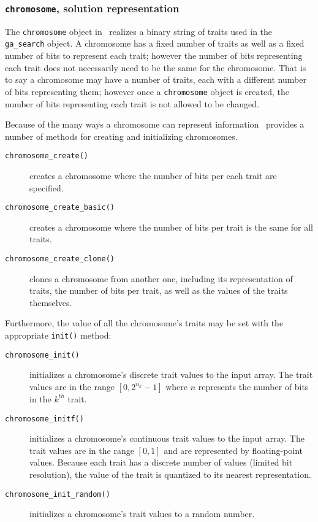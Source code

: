 \subsubsection{{\tt chromosome}, solution representation}
\label{module:optim:ga_search:chromosome}
The {\tt chromosome} object in \liquid\ realizes a binary string of
traits used in the {\tt ga\_search} object.
A chromosome has a fixed number of traits as well as a fixed number of
bits to represent each trait;
however the number of bits representing each trait does not necessarily
need to be the same for the chromosome.
That is to say a chromosome may have a number of traits, each with a
different number of bits representing them;
however once a {\tt chromosome} object is created, the number of bits
representing each trait is not allowed to be changed.

Because of the many ways a chromosome can represent information \liquid\
provides a number of methods for creating and initializing chromosomes.
%
\begin{description}
\item[{\tt chromosome\_create()}]
    creates a chromosome where the number of bits per each trait are
    specified.
\item[{\tt chromosome\_create\_basic()}]
    creates a chromosome where the number of bits per trait is the same
    for all traits.
\item[{\tt chromosome\_create\_clone()}]
    clones a chromosome from another one, including its representation
    of traits, the number of bits per trait, as well as the values of
    the traits themselves.
\end{description}
%
Furthermore, the value of all the chromosome's traits may be set with
the appropriate {\tt init()} method:
%
\begin{description}
\item[{\tt chromosome\_init()}]
    initializes a chromosome's discrete trait values to the input array.
    The trait values are in the range $[0,2^{n_k}-1]$ where $n$
    represents the number of bits in the $k^{th}$ trait.
\item[{\tt chromosome\_initf()}]
    initializes a chromosome's continuous trait values to the input
    array.
    The trait values are in the range $[0,1]$ and are represented by
    floating-point values.
    Because each trait has a discrete number of values (limited bit
    resolution), the value of the trait is quantized to its nearest
    representation.
\item[{\tt chromosome\_init\_random()}]
    initializes a chromosome's trait values to a random number.
\end{description}
